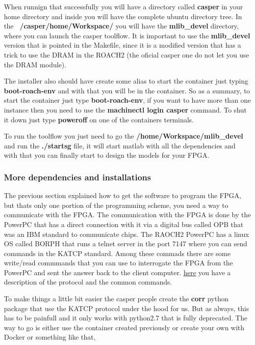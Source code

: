When runnign that successfully you will have a directory called \textbf{casper} in your home directory and inside you will have the complete ubuntu directory tree. In the \textbf{~/casper/home/Workspace/} you will have the \textbf{mlib\_devel} directory, where you can launch the casper toolflow. It is important to use the \textbf{mlib\_devel} version that is pointed in the Makefile, since it is a modified version that has a trick to use the DRAM in the ROACH2 (the oficial casper one do not let you use the DRAM module). 



The installer also should have create some alias to start the container just typing \textbf{boot-roach-env} and with that you will be in the container.
So as a summary, to start the container just type \textbf{boot-roach-env}, if you want to have more than one instance then you need to use the \textbf{machinectl login casper} command. To shut it down just type \textbf{poweroff} on one of the containers terminals.

To run the toolflow you just need to go the \textbf{/home/Workspace/mlib\_devel} and run the \textbf{./startsg} file, it will start matlab with all the dependencies and with that you can finally start to design the models for your FPGA.





\subsubsection{More dependencies and installations}
The previous section explained how to get the software to program the FPGA, but thats only one portion of the programming scheme, you need a way to communicate with the FPGA. The communication with the FPGA is done by the PowerPC that has a direct connection with it via a digital bus called OPB that was an IBM standard to communicate chips. 
The RAOCH2 PowerPC has a linux OS called BORPH that runs a telnet server in the port 7147 where you can send commands in the KATCP standard. Among these commads there are some write/read commmands that you can use to interrogate the FPGA from the PowerPC and sent the answer back to the client computer. 
\href{https://casper.berkeley.edu/wiki/Tcpborphserver}{here} you have a description of the protocol and the common commands.

To make things a little bit easier the casper people create the \textbf{corr} python package that use the KATCP protocol under the hood for us. But as always, this has to be painfull and it only works with python2.7 that is fully deprecated. 
The way to go is either use the container created previously or create your own with Docker or something like that,


